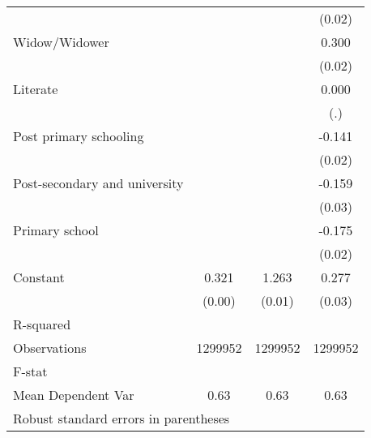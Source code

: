 {\begin{tabular}{l*{3}{c}}
                    &                     &                     &      (0.02)         \\
Widow/Widower       &                     &                     &       0.300\sym{***}\\
                    &                     &                     &      (0.02)         \\
Literate            &                     &                     &       0.000         \\
                    &                     &                     &         (.)         \\
Post primary schooling&                     &                     &      -0.141\sym{***}\\
                    &                     &                     &      (0.02)         \\
Post-secondary and university&                     &                     &      -0.159\sym{***}\\
                    &                     &                     &      (0.03)         \\
Primary school      &                     &                     &      -0.175\sym{***}\\
                    &                     &                     &      (0.02)         \\
Constant            &       0.321\sym{***}&       1.263\sym{***}&       0.277\sym{***}\\
                    &      (0.00)         &      (0.01)         &      (0.03)         \\
\hline
R-squared           &                     &                     &                     \\
Observations        &     1299952         &     1299952         &     1299952         \\
F-stat              &                     &                     &                     \\
Mean Dependent Var  &        0.63         &        0.63         &        0.63         \\
\hline\hline
\multicolumn{4}{l}{\footnotesize Robust standard errors in parentheses}\\
\end{tabular}
}
